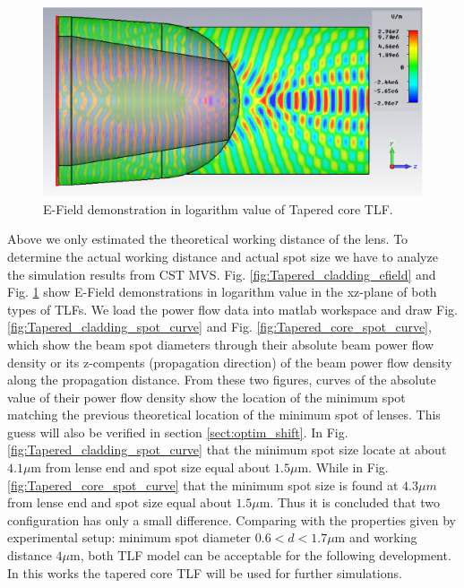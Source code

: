 \begin{figure}[!ht]
	\centering
		\includegraphics[width=0.8 \textwidth]{bilder/cst_lensed_fiber_efield}
		\caption{E-Field demonstration in logarithm value of Tapered core TLF.}
 		\label{fig:Tapered_core_efield}	
\end{figure}
Above we only estimated the theoretical working distance of the lens. To determine the actual working distance and actual spot size we have to analyze the simulation results from CST MVS. Fig. \ref{fig:Tapered_cladding_efield} and Fig. \ref{fig:Tapered_core_efield} show  E-Field demonstrations  in logarithm value in the xz-plane of both types of TLFs. We load the power flow data into matlab workspace and draw Fig. \ref{fig:Tapered_cladding_spot_curve} and Fig. \ref{fig:Tapered_core_spot_curve}, which show the beam spot diameters through their absolute beam power flow density or its z-compents (propagation direction) of the beam power flow density along the propagation distance. From these two figures, curves of the absolute value of their power flow density show the location of the minimum spot matching the previous theoretical location of the minimum spot of lenses. This guess will also be verified in section \ref{sect:optim_shift}. In Fig. \ref{fig:Tapered_cladding_spot_curve} that the minimum spot size locate at about $4.1 \mu$m from lense end and spot size equal about $1.5 \mu$m. While in Fig. \ref{fig:Tapered_core_spot_curve} that the minimum spot size is found at  $4.3 \mu m$ from lense end and spot size equal about $1.5 \mu$m. Thus it is concluded that two configuration has only a small difference. Comparing with the properties given by experimental setup: minimum spot diameter $0.6<d<1.7 \mu$m and working distance $4\mu$m, both TLF model can be acceptable for the following development. In this works the tapered core TLF will be used for further simulations.\\

